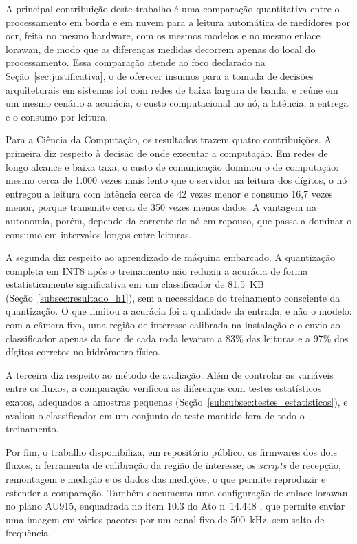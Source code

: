 A principal contribuição deste trabalho é uma comparação quantitativa entre o processamento
em borda e em nuvem para a leitura automática de medidores por \gls{ocr}, feita no mesmo
hardware, com os mesmos modelos e no mesmo enlace \gls{lorawan}, de modo que as diferenças
medidas decorrem apenas do local do processamento. Essa comparação atende ao foco declarado
na Seção~\ref{sec:justificativa}, o de oferecer insumos para a tomada de decisões
arquiteturais em sistemas \gls{iot} com redes de baixa largura de banda, e reúne em um mesmo
cenário a acurácia, o custo computacional no nó, a latência, a entrega e o consumo por
leitura.

Para a Ciência da Computação, os resultados trazem quatro contribuições. A primeira diz
respeito à decisão de onde executar a computação. Em redes de longo alcance e baixa taxa, o
custo de comunicação dominou o de computação: mesmo cerca de 1.000 vezes mais lento que o
servidor na leitura dos dígitos, o nó entregou a leitura com latência cerca de 42 vezes
menor e consumo 16,7 vezes menor, porque transmite cerca de 350 vezes menos dados. A
vantagem na autonomia, porém, depende da corrente do nó em repouso, que passa a dominar o
consumo em intervalos longos entre leituras.

A segunda diz respeito ao aprendizado de máquina embarcado. A quantização completa em INT8
após o treinamento não reduziu a acurácia de forma estatisticamente significativa em um
classificador de 81,5~KB (Seção~\ref{subsec:resultado_h1}), sem a necessidade do
treinamento consciente da quantização. O que limitou a acurácia foi a qualidade da entrada,
e não o modelo: com a câmera fixa, uma região de interesse calibrada na instalação e o
envio ao classificador apenas da face de cada roda levaram a 83\% das leituras e a 97\% dos
dígitos corretos no hidrômetro físico.

A terceira diz respeito ao método de avaliação. Além de controlar as variáveis entre os
fluxos, a comparação verificou as diferenças com testes estatísticos exatos, adequados a
amostras pequenas (Seção~\ref{subsubsec:testes_estatisticos}), e avaliou o classificador em
um conjunto de teste mantido fora de todo o treinamento.

Por fim, o trabalho disponibiliza, em repositório público, os firmwares dos dois fluxos, a
ferramenta de calibração da região de interesse, os \textit{scripts} de recepção,
remontagem e medição e os dados das medições, o que permite reproduzir e estender a
comparação. Também documenta uma configuração de enlace \gls{lorawan} no plano AU915,
enquadrada no item 10.3 do Ato n\textordmasculine~14.448 \cite{anatel2017}, que permite
enviar uma imagem em vários pacotes por um canal fixo de 500~kHz, sem salto de frequência.
